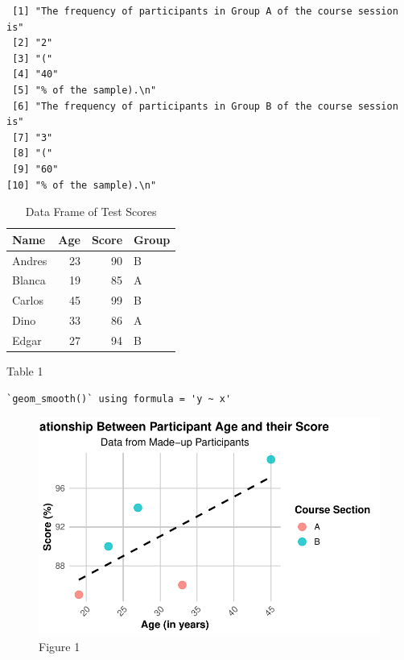 \documentclass[
  letterpaper,
  DIV=11,
  numbers=noendperiod]{scrartcl}
\begin{document}
\begin{verbatim}
 [1] "The frequency of participants in Group A of the course session is"
 [2] "2"                                                                
 [3] "("                                                                
 [4] "40"                                                               
 [5] "% of the sample).\n"                                              
 [6] "The frequency of participants in Group B of the course session is"
 [7] "3"                                                                
 [8] "("                                                                
 [9] "60"                                                               
[10] "% of the sample).\n"                                              
\end{verbatim}

\begin{table}
\centering
\caption{Data Frame of Test Scores}
\centering
\begin{tabular}[t]{l|r|r|l}
\hline
Name & Age & Score & Group\\
\hline
Andres & 23 & 90 & B\\
\hline
Blanca & 19 & 85 & A\\
\hline
Carlos & 45 & 99 & B\\
\hline
Dino & 33 & 86 & A\\
\hline
Edgar & 27 & 94 & B\\
\hline
\end{tabular}
\end{table}

Table 1

\begin{verbatim}
`geom_smooth()` using formula = 'y ~ x'
\end{verbatim}

\begin{figure}[H]

{\centering \includegraphics{collaborative_notebook_files/figure-pdf/publication quality figure 1-1.pdf}

}

\caption{Figure 1}

\end{figure}%
\end{document}
